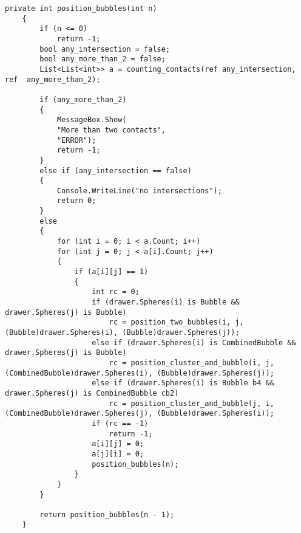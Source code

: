 \begin{lstlisting}[label=lst:position_objects, caption=Реализация алгоритма анализа объектов сцены]
	private int position_bubbles(int n)
	{
		if (n <= 0)
			return -1;
		bool any_intersection = false;
		bool any_more_than_2 = false;
		List<List<int>> a = counting_contacts(ref any_intersection, ref  any_more_than_2);
		
		if (any_more_than_2)
		{
			MessageBox.Show(
			"More than two contacts",
			"ERROR");
			return -1;
		}
		else if (any_intersection == false)
		{
			Console.WriteLine("no intersections");
			return 0;
		}
		else
		{
			for (int i = 0; i < a.Count; i++)
			for (int j = 0; j < a[i].Count; j++)
			{
				if (a[i][j] == 1)
				{
					int rc = 0;
					if (drawer.Spheres(i) is Bubble && drawer.Spheres(j) is Bubble)
						rc = position_two_bubbles(i, j, (Bubble)drawer.Spheres(i), (Bubble)drawer.Spheres(j));
					else if (drawer.Spheres(i) is CombinedBubble && drawer.Spheres(j) is Bubble)
						rc = position_cluster_and_bubble(i, j, (CombinedBubble)drawer.Spheres(i), (Bubble)drawer.Spheres(j));
					else if (drawer.Spheres(i) is Bubble b4 && drawer.Spheres(j) is CombinedBubble cb2)
						rc = position_cluster_and_bubble(j, i, (CombinedBubble)drawer.Spheres(j), (Bubble)drawer.Spheres(i));
					if (rc == -1)
						return -1;
					a[i][j] = 0;
					a[j][i] = 0;
					position_bubbles(n);
				}
			}
		}
		
		return position_bubbles(n - 1);
	}
\end{lstlisting} 
